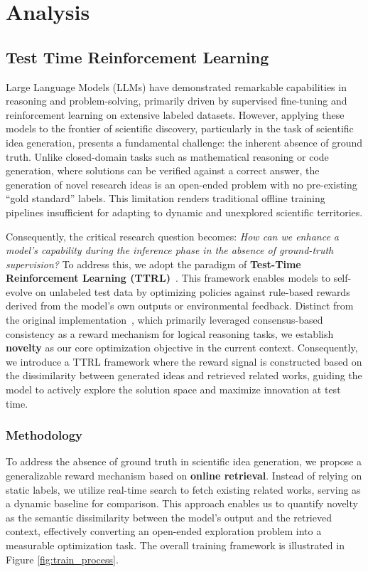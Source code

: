 \section{Analysis}


\subsection{Test Time Reinforcement Learning}

Large Language Models (LLMs) have demonstrated remarkable capabilities in reasoning and problem-solving, primarily driven by supervised fine-tuning and reinforcement learning on extensive labeled datasets. However, applying these models to the frontier of scientific discovery, particularly in the task of scientific idea generation, presents a fundamental challenge: the inherent absence of ground truth. Unlike closed-domain tasks such as mathematical reasoning or code generation, where solutions can be verified against a correct answer, the generation of novel research ideas is an open-ended problem with no pre-existing ``gold standard'' labels. This limitation renders traditional offline training pipelines insufficient for adapting to dynamic and unexplored scientific territories. 

Consequently, the critical research question becomes: \textit{How can we enhance a model's capability during the inference phase in the absence of ground-truth supervision?} To address this, we adopt the paradigm of \textbf{Test-Time Reinforcement Learning (TTRL)}~\cite{zuo2025ttrl}. This framework enables models to self-evolve on unlabeled test data by optimizing policies against rule-based rewards derived from the model's own outputs or environmental feedback. Distinct from the original implementation~\cite{zuo2025ttrl}, which primarily leveraged consensus-based consistency as a reward mechanism for logical reasoning tasks, we establish \textbf{novelty} as our core optimization objective in the current context. Consequently, we introduce a TTRL framework where the reward signal is constructed based on the dissimilarity between generated ideas and retrieved related works, guiding the model to actively explore the solution space and maximize innovation at test time.

\subsubsection{Methodology}

To address the absence of ground truth in scientific idea generation, we propose a generalizable reward mechanism based on \textbf{online retrieval}. Instead of relying on static labels, we utilize real-time search to fetch existing related works, serving as a dynamic baseline for comparison. This approach enables us to quantify novelty as the semantic dissimilarity between the model's output and the retrieved context, effectively converting an open-ended exploration problem into a measurable optimization task. The overall training framework is illustrated in Figure \ref{fig:train_process}.

